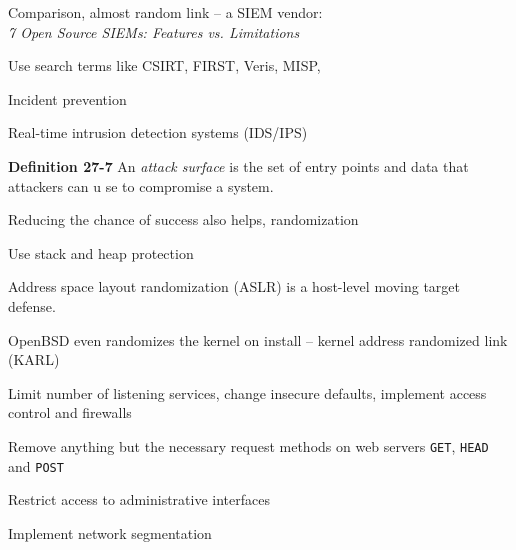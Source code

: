 \documentclass[Screen16to9,17pt]{foils}
\begin{document}
Comparison, almost random link -- a SIEM vendor:\\
\emph{7 Open Source SIEMs: Features vs. Limitations}\\





\begin{quote}

\end{quote}

\begin{list2}
  \item Use search terms like CSIRT, FIRST, Veris, MISP,
\end{list2}






\begin{list2}
\item Incident prevention
\item Real-time intrusion detection systems (IDS/IPS)
\item {\bf Definition 27-7} An \emph{attack surface} is the set of entry points and data that attackers can u
se to compromise a system.
\item Reducing the chance of success also helps, randomization
\item Use stack and heap protection
\item Address space layout randomization (ASLR) is a host-level moving target defense.
\item OpenBSD even randomizes the kernel on install -- kernel address randomized link (KARL)
\item Limit number of listening services, change insecure defaults, implement access control and firewalls
\item Remove anything but the necessary request methods on web servers \verb+GET+, \verb+HEAD+ and \verb+POST+
\item Restrict access to administrative interfaces
\item Implement network segmentation
\end{list2}



\end{document}

